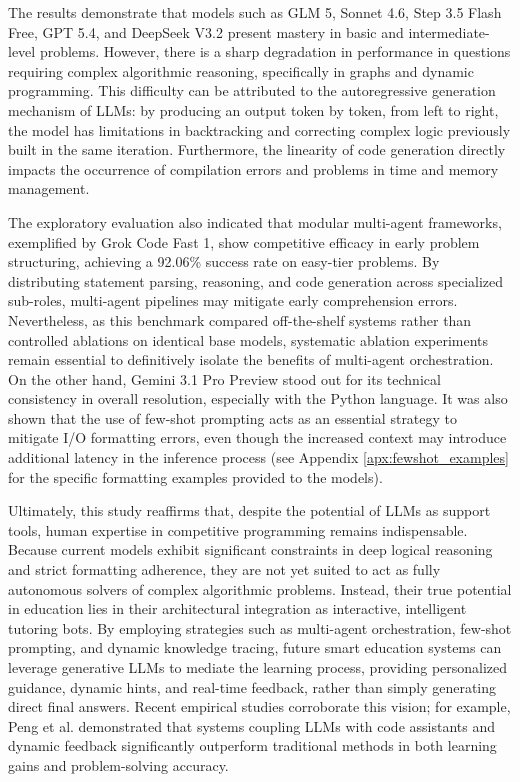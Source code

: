 \documentclass[conference]{IEEEtran}
\begin{document}
The results demonstrate that models such as GLM 5, Sonnet 4.6, Step 3.5 Flash Free, GPT 5.4, and DeepSeek V3.2 present mastery in basic and intermediate-level problems. However, there is a sharp degradation in performance in questions requiring complex algorithmic reasoning, specifically in graphs and dynamic programming. This difficulty can be attributed to the autoregressive generation mechanism of LLMs: by producing an output token by token, from left to right, the model has limitations in backtracking and correcting complex logic previously built in the same iteration. Furthermore, the linearity of code generation directly impacts the occurrence of compilation errors and problems in time and memory management.

The exploratory evaluation also indicated that modular multi-agent frameworks, exemplified by Grok Code Fast 1, show competitive efficacy in early problem structuring, achieving a 92.06\% success rate on easy-tier problems. By distributing statement parsing, reasoning, and code generation across specialized sub-roles, multi-agent pipelines may mitigate early comprehension errors. Nevertheless, as this benchmark compared off-the-shelf systems rather than controlled ablations on identical base models, systematic ablation experiments remain essential to definitively isolate the benefits of multi-agent orchestration. On the other hand, Gemini 3.1 Pro Preview stood out for its technical consistency in overall resolution, especially with the Python language. It was also shown that the use of few-shot prompting acts as an essential strategy to mitigate I/O formatting errors, even though the increased context may introduce additional latency in the inference process (see Appendix \ref{apx:fewshot_examples} for the specific formatting examples provided to the models).

Ultimately, this study reaffirms that, despite the potential of LLMs as support tools, human expertise in competitive programming remains indispensable. Because current models exhibit significant constraints in deep logical reasoning and strict formatting adherence, they are not yet suited to act as fully autonomous solvers of complex algorithmic problems. Instead, their true potential in education lies in their architectural integration as interactive, intelligent tutoring bots. By employing strategies such as multi-agent orchestration, few-shot prompting, and dynamic knowledge tracing, future smart education systems can leverage generative LLMs to mediate the learning process, providing personalized guidance, dynamic hints, and real-time feedback, rather than simply generating direct final answers. Recent empirical studies corroborate this vision; for example, Peng et al. \cite{peng2025enhancing} demonstrated that systems coupling LLMs with code assistants and dynamic feedback significantly outperform traditional methods in both learning gains and problem-solving accuracy.
\end{document}
